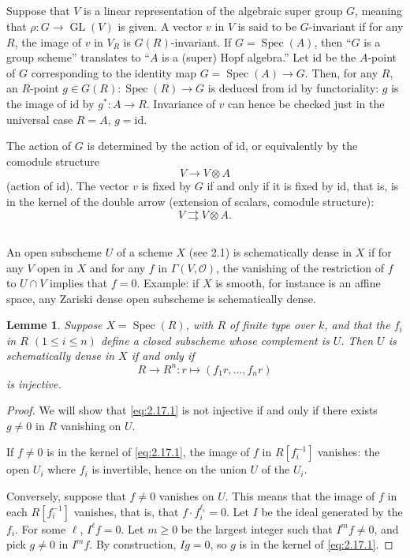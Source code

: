 \documentclass[11pt,a4paper]{article}
\theoremstyle{plain}
\newtheorem{lemma}[theorem]{Lemme}
\theoremstyle{definition}
\DeclareMathOperator{\Spec}{Spec}
\DeclareMathOperator{\GL}{GL}
\begin{document}
\subsection{}
\label{sec:2.15}
Suppose that $V$ is a linear representation of the algebraic super group $G$, meaning that $\rho: G \to \GL(V)$ is given. A vector $v$ in $V$ is said to be $G$-invariant if for any $R$, the image of $v$ in $V_R$ is $G(R)$-invariant. If $G = \Spec(A)$, then ``$G$ is a group scheme'' translates to ``$A$ is a (super) Hopf algebra.'' Let $\mathrm{id}$ be the $A$-point of $G$ corresponding to the identity map $G = \Spec(A) \to G$. Then, for any $R$, an $R$-point $g \in G(R) : \Spec(R) \to G$ is deduced from $\mathrm{id}$ by functoriality: $g$ is the image of $\mathrm{id}$ by $g^* : A \to R$. Invariance of $v$ can hence be checked just in the universal case $R = A$, $g = \mathrm{id}$.

The action of $G$ is determined by the action of $\mathrm{id}$, or equivalently by the comodule structure
\[
V \to V \otimes A
\]
(action of $\mathrm{id}$). The vector $v$ is fixed by $G$ if and only if it is fixed by $\mathrm{id}$, that is, is in the kernel of the double arrow (extension of scalars, comodule structure):
\[
V \rightrightarrows V \otimes A.
\]

\subsection{}
An open subscheme $U$ of a scheme $X$ (see 2.1) is schematically dense in $X$ if for any $V$ open in $X$ and for any $f$ in $\Gamma(V, \mathcal{O})$, the vanishing of the restriction of $f$ to $U \cap V$ implies that $f = 0$. Example: if $X$ is smooth, for instance is an affine space, any Zariski dense open subscheme is schematically dense.

\begin{lemma}\label{lem:2.17}
Suppose $X = \Spec(R)$, with $R$ of finite type over $k$, and that the $f_i$ in $R$ $(1 \leq i \leq n)$ define a closed subscheme whose complement is $U$. Then $U$ is schematically dense in $X$ if and only if
\begin{equation}\label{eq:2.17.1}
R \to R^n : r \mapsto (f_1 r, \dots, f_n r)
\end{equation}
is injective.
\end{lemma}

\begin{proof}
We will show that \eqref{eq:2.17.1} is not injective if and only if there exists $g \neq 0$ in $R$ vanishing on $U$.

If $f \neq 0$ is in the kernel of \eqref{eq:2.17.1}, the image of $f$ in $R[f_i^{-1}]$ vanishes: the open $U_i$ where $f_i$ is invertible, hence on the union $U$ of the $U_i$.

Conversely, suppose that $f \neq 0$ vanishes on $U$. This means that the image of $f$ in each $R[f_i^{-1}]$ vanishes, that is, that $f \cdot f_i^{\ell_i} = 0$. Let $I$ be the ideal generated by the $f_i$. For some $\ell$, $I^\ell f = 0$. Let $m \geq 0$ be the largest integer such that $I^m f \neq 0$, and pick $g \neq 0$ in $I^m f$. By construction, $Ig = 0$, so $g$ is in the kernel of \eqref{eq:2.17.1}.
\end{proof}
\end{document}
